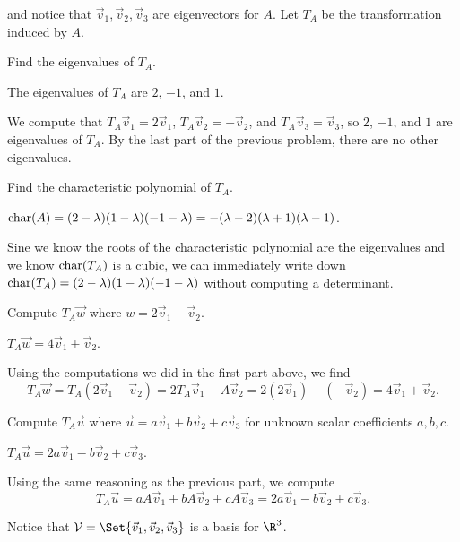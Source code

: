 	and notice that $\vec v_1,\vec v_2,\vec v_3$ are eigenvectors for $A$. Let $T_A$ be the transformation induced by $A$.
	\begin{parts}
		\item Find the eigenvalues of $T_A$.
			\begin{solution}
				The eigenvalues of $T_A$ are $2$, $-1$, and $1$.

				We compute that $T_A\vec v_1=2\vec v_1$, $T_A\vec v_2=-\vec v_2$,
				and $T_A\vec v_3=\vec v_3$, so $2$, $-1$, and $1$ are eigenvalues
				of $T_A$. By the last part of the previous problem, there are no
				other eigenvalues.
			\end{solution}
		\item Find the characteristic polynomial of $T_A$.
			\begin{solution}
				$\operatorname{char}(A)=(2-\lambda)(1-\lambda)(-1-\lambda)=-(\lambda-2)(\lambda+1)(\lambda-1)$.
				
				Sine we know the roots of the characteristic polynomial are the eigenvalues and
				we know $\operatorname{char}(T_A)$ is a cubic, we can immediately write down
				$\operatorname{char}(T_A)=(2-\lambda)(1-\lambda)(-1-\lambda)$ without computing a determinant.
			\end{solution}
		\item Compute $T_A\vec w$ where $w=2\vec v_1-\vec v_2$.
			\begin{solution}
				$T_A\vec w=4\vec v_1+\vec v_2$.

				Using the computations we did in the first part above, we find
				\[
					T_A\vec w
					=T_A(2\vec v_1-\vec v_2)
					=2T_A\vec v_1-A\vec v_2
					=2(2\vec v_1)-(-\vec v_2)
					=4\vec v_1+\vec v_2.
				\]
			\end{solution}
		\item Compute $T_A\vec u$ where $\vec u=a\vec v_1+b\vec v_2+c\vec v_3$ for
			unknown scalar coefficients $a,b,c$.
			\begin{solution}
				$T_A\vec u=2a\vec v_1-b\vec v_2+c\vec v_3$.

				Using the same reasoning as the previous part, we compute
				\[
					T_A\vec u
					=aA\vec v_1+bA\vec v_2+cA\vec v_3
					=2a\vec v_1-b\vec v_2+c\vec v_3.
				\]
			\end{solution}
	\end{parts}
	Notice that $\mathcal V=\Set{\vec v_1,\vec v_2,\vec v_3}$ is a basis for $\R^3$.
